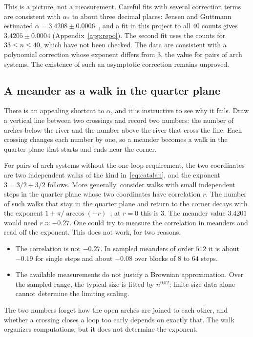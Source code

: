 This is a picture, not a measurement. Careful fits with several correction terms are consistent
with $\alpha_*$ to about three decimal places: Jensen and Guttmann estimated
$\alpha=3.4208\pm0.0006$~\cite{JG}, and a fit in this project to all $40$ counts gives
$3.4205\pm0.0004$ (Appendix~\ref{app:repo}). The second fit uses the counts for $33\le n\le40$,
which have not been checked. The data are consistent with a polynomial correction whose exponent differs from $3$, the
value for pairs of arch systems. The existence of such an asymptotic correction remains unproved.

\subsection{A meander as a walk in the quarter plane}\label{sec:quarter}

There is an appealing shortcut to $\alpha$, and it is instructive to see why it fails. Draw a
vertical line between two crossings and record two numbers: the number of arches
below the river and the number above the river that cross the line. Each crossing changes each
number by one, so a meander becomes a walk in the quarter plane that starts and ends near the
corner.

For pairs of arch systems without the one-loop requirement, the two coordinates are two
independent walks of the kind in~\eqref{eq:catalan}, and the exponent $3=3/2+3/2$ follows. More
generally, consider walks with small independent steps in the quarter plane whose two coordinates
have correlation $r$. The number of such walks that stay in the quarter plane and return to the
corner decays with the exponent $1+\pi/\arccos(-r)$~\cite{DW}; at $r=0$ this is $3$. The meander value $3.4201$ would
need $r\approx -0.27$. One could try to measure the correlation in meanders and read off the
exponent. This does not work, for two reasons.

\begin{itemize}
\item The correlation is not $-0.27$. In sampled meanders of order $512$ it is about $-0.19$
for single steps and about $-0.08$ over blocks of $8$ to $64$ steps.
\item The available measurements do not justify a Brownian approximation. Over the sampled range,
the typical size is fitted by $n^{0.52}$; finite-size data alone cannot determine the limiting scaling.
\end{itemize}

The two numbers forget how the open arches are joined to each other, and whether a crossing
closes a loop too early depends on exactly that. The walk organizes computations, but it does not
determine the exponent.

